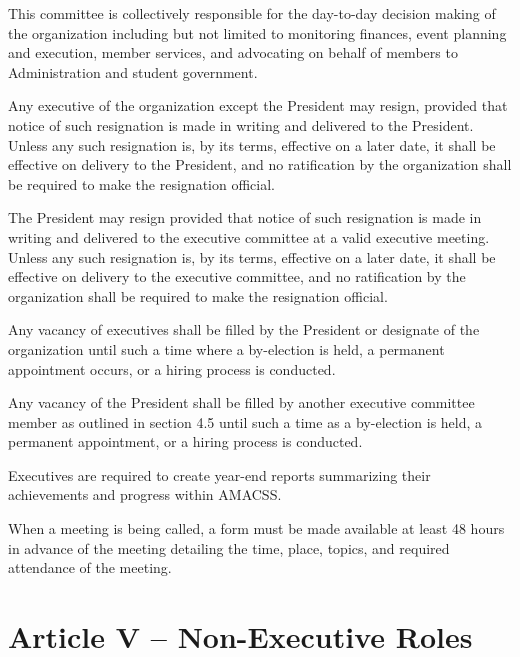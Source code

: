 \documentclass[12pt,a4paper]{article}
\begin{document}
\begin{constitutionlist}
\item This committee is collectively responsible for the day-to-day decision making of the organization including but not limited to monitoring finances, event planning and execution, member services, and advocating on behalf of members to Administration and student government.

\item Any executive of the organization except the President may resign, provided that notice of such resignation is made in writing and delivered to the President. Unless any such resignation is, by its terms, effective on a later date, it shall be effective on delivery to the President, and no ratification by the organization shall be required to make the resignation official.

\item The President may resign provided that notice of such resignation is made in writing and delivered to the executive committee at a valid executive meeting. Unless any such resignation is, by its terms, effective on a later date, it shall be effective on delivery to the executive committee, and no ratification by the organization shall be required to make the resignation official.

\item Any vacancy of executives shall be filled by the President or designate of the organization until such a time where a by-election is held, a permanent appointment occurs, or a hiring process is conducted.

\item Any vacancy of the President shall be filled by another executive committee member as outlined in section 4.5 until such a time as a by-election is held, a permanent appointment, or a hiring process is conducted.

\item Executives are required to create year-end reports summarizing their achievements and progress within AMACSS.

\item When a meeting is being called, a form must be made available at least 48 hours in advance of the meeting detailing the time, place, topics, and required attendance of the meeting.
\end{constitutionlist}

\section{Article V – Non-Executive Roles}
\end{document}
